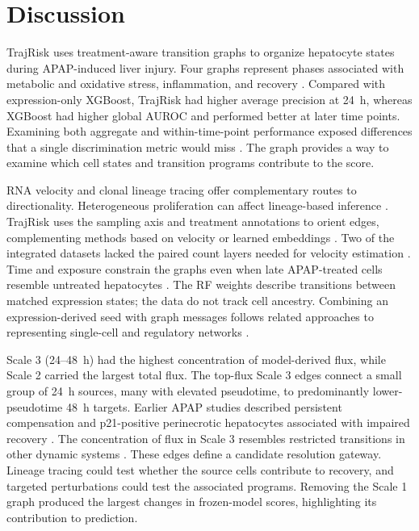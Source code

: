\section*{Discussion}

TrajRisk uses treatment-aware transition graphs to organize hepatocyte states during APAP-induced liver injury. Four graphs represent phases associated with metabolic and oxidative stress, inflammation, and recovery \cite{ref010,ref018,ref034,ref049}. Compared with expression-only XGBoost, TrajRisk had higher average precision at 24~h, whereas XGBoost had higher global AUROC and performed better at later time points. Examining both aggregate and within-time-point performance exposed differences that a single discrimination metric would miss \cite{ref050,ref051}. The graph provides a way to examine which cell states and transition programs contribute to the score.

RNA velocity \cite{ref014,ref015} and clonal lineage tracing \cite{ref016,ref052,ref053,ref054} offer complementary routes to directionality. Heterogeneous proliferation can affect lineage-based inference \cite{ref055}. TrajRisk uses the sampling axis and treatment annotations to orient edges, complementing methods based on velocity or learned embeddings \cite{ref041,ref056,ref057}. Two of the integrated datasets lacked the paired count layers needed for velocity estimation \cite{ref014,ref058}. Time and exposure constrain the graphs even when late APAP-treated cells resemble untreated hepatocytes \cite{ref010}. The RF weights describe transitions between matched expression states; the data do not track cell ancestry. Combining an expression-derived seed with graph messages follows related approaches to representing single-cell and regulatory networks \cite{ref059,ref060}.

Scale 3 (24--48~h) had the highest concentration of model-derived flux, while Scale 2 carried the largest total flux. The top-flux Scale 3 edges connect a small group of 24~h sources, many with elevated pseudotime, to predominantly lower-pseudotime 48~h targets. Earlier APAP studies described persistent compensation \cite{ref010} and p21-positive perinecrotic hepatocytes associated with impaired recovery \cite{ref061}. The concentration of flux in Scale 3 resembles restricted transitions in other dynamic systems \cite{ref062,ref063}. These edges define a candidate resolution gateway. Lineage tracing could test whether the source cells contribute to recovery, and targeted perturbations could test the associated programs. Removing the Scale 1 graph produced the largest changes in frozen-model scores, highlighting its contribution to prediction.

